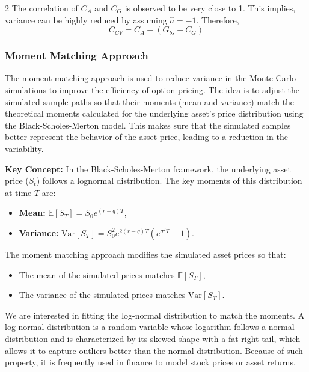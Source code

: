 \begin{multicols}{2}
The correlation of $C_A$ and $C_G$ is observed to be very close to 1. This implies, variance can be highly reduced by assuming $\hat{a} = -1$. Therefore,
$$
    C_{CV} = C_A + (G_{bs} - C_G)
$$
\subsubsection{Moment Matching Approach}

The moment matching approach is used to reduce variance in the Monte Carlo simulations to improve the efficiency of option pricing. The idea is to adjust the simulated sample paths so that their moments (mean and variance) match the theoretical moments calculated for the underlying asset's price distribution using the Black-Scholes-Merton model. This makes sure that the simulated samples better represent the behavior of the asset price, leading to a reduction in the variability.

\textbf{Key Concept:}  
In the Black-Scholes-Merton framework, the underlying asset price (\(S_t\)) follows a lognormal distribution. The key moments of this distribution at time \(T\) are:
\begin{itemize}
    \item \textbf{Mean:} \(\mathbb{E}[S_T] = S_0 e^{(r-q)T}\),
    \item \textbf{Variance:} \(\text{Var}[S_T] = S_0^2 e^{2(r-q)T}(e^{\sigma^2 T} - 1)\).
\end{itemize}

The moment matching approach modifies the simulated asset prices so that:
\begin{itemize}
    \item The mean of the simulated prices matches \(\mathbb{E}[S_T]\),
    \item The variance of the simulated prices matches \(\text{Var}[S_T]\).
\end{itemize}

We are interested in fitting the log-normal distribution to match the moments. A log-normal distribution is a random variable whose logarithm follows a normal distribution and is characterized by its skewed shape with a fat right tail, which allows it to capture outliers better than the normal distribution. Because of such property, it is frequently used in finance to model stock prices or asset returns.


\end{multicols}
